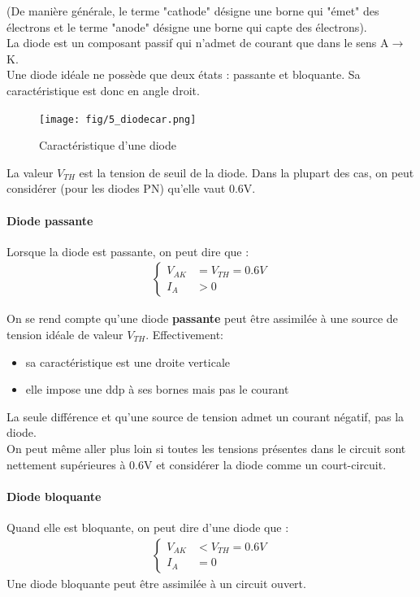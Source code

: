 \documentclass[a4paper]{article}
\begin{document}
    (De manière générale, le terme "cathode" désigne une borne qui "émet" des électrons
    et le terme "anode" désigne une borne qui capte des électrons).\\

    La diode est un composant passif qui n'admet de courant que dans le sens A$\rightarrow$K.\\

    Une diode idéale ne possède que deux états : passante et bloquante. Sa 
    caractéristique est donc en angle droit.
    \begin{figure}[H]
        \begin{center}
            \texttt{[image: fig/5\_diodecar.png]}
            \caption{Caractéristique d'une diode}
            \label{fig:5_diodecar}
        \end{center}
    \end{figure}
    La valeur $V_{TH}$ est la tension de seuil de la diode. Dans la plupart des cas,
    on peut considérer (pour les diodes PN) qu'elle vaut 0.6V.

    \paragraph{Diode passante}
    Lorsque la diode est passante, on peut dire que :
    \begin{align*}
        \begin{cases}
            V_{AK} &= V_{TH} = 0.6V\\
            I_A &> 0
        \end{cases}
    \end{align*}

    On se rend compte qu'une diode \textbf{passante} peut être assimilée à une
    source de tension idéale de valeur $V_{TH}$. Effectivement:
    \begin{itemize}
        \item sa caractéristique est une droite verticale
        \item elle impose une ddp à ses bornes mais pas le courant
    \end{itemize}
    La seule différence et qu'une source de tension admet un courant négatif, pas la diode.\\

    On peut même aller plus loin si toutes les tensions présentes dans le circuit
    sont nettement supérieures à 0.6V et considérer la diode comme un court-circuit.

    \paragraph{Diode bloquante}
    Quand elle est bloquante, on peut dire d'une diode que :
    \begin{align*}
        \begin{cases}
            V_{AK} &< V_{TH} = 0.6V\\
            I_A &= 0
        \end{cases}
    \end{align*}
    Une diode bloquante peut être assimilée à un circuit ouvert.
\end{document}
